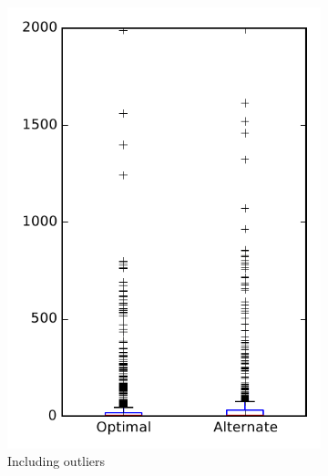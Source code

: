 
\begin{figure}
    \centering
    \begin{subfigure}{.4\textwidth}
        \centering
        \includegraphics[height=0.4\textheight]{figures/combo/flt_rq2_all}
        \caption{Including outliers}\label{fig:combo:flt:rq2:all_outlier}
    \end{subfigure}%
    \begin{subfigure}{.4\textwidth}
        \centering

\end{subfigure}
\end{figure}
